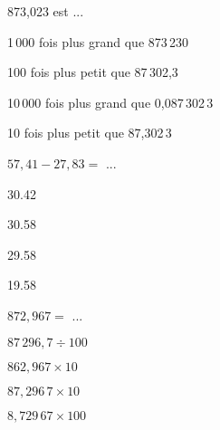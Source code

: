 \begin{QCM}
\begin{GroupeQCM}
     \begin{exercice}
      873,023 est ...
      \begin{ChoixQCM}{4}
      \item 1\,000 fois plus grand que 873\,230
      \item 100 fois plus petit que 87\,302,3
      \item 10\,000 fois plus grand que 0,087\,302\,3
      \item 10 fois plus petit que 87,302\,3
      \end{ChoixQCM}
      \begin{corrige}
   \end{corrige}
    \end{exercice}
    
     \begin{exercice}
      $57,41 - 27,83 =$ ...
      \begin{ChoixQCM}{4}
      \item 30.42
      \item 30.58
      \item 29.58
      \item 19.58
      \end{ChoixQCM}
      \begin{corrige}
   \end{corrige}
    \end{exercice}


     \begin{exercice}
      $872,967 =$ ...
      \begin{ChoixQCM}{4}
      \item $87\,296,7 \div 100$
      \item $862,967 \times 10$
      \item $87,296\,7 \times 10$
      \item $8,729\,67 \times 100$
      \end{ChoixQCM}
      \begin{corrige}
   \end{corrige}
    \end{exercice}
\end{GroupeQCM}
\end{QCM}

